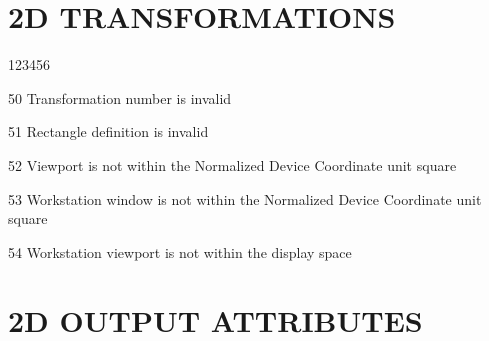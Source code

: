 \section{2D TRANSFORMATIONS}
\begin{DLtt}{123456}
\item[50]
Transformation number is invalid
\item[51]
Rectangle definition is invalid
\item[52]
Viewport is not within the Normalized Device Coordinate unit square
\item[53]
Workstation window is not within the Normalized Device Coordinate unit
square
\item[54]
Workstation viewport is not within the display space
\end{DLtt}
\section{2D OUTPUT ATTRIBUTES}
